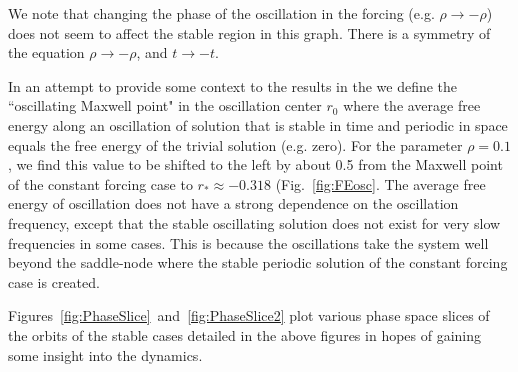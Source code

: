 \documentclass[../main/TimeForcingSHE.tex]{subfiles}
\begin{document}
We note that changing the phase of the oscillation in the forcing (e.g. $\rho\rightarrow-\rho$) does not seem to affect the stable region in this graph. There is a symmetry of the equation $\rho\rightarrow -\rho$, and $t \rightarrow -t$.  


In an attempt to provide some context to the results in the we define the ``oscillating Maxwell point" in the oscillation center $r_0$ where the average free energy along an oscillation of solution that is stable in time and  periodic in space equals the free energy of the trivial solution (e.g. zero).  For the parameter $\rho=0.1$, we find this value to be shifted to the left by about 0.5 from the Maxwell point of the constant forcing case to $r_*\approx -0.318$ (Fig.~\ref{fig:FEosc}.  The average free energy of oscillation does not have a strong dependence on the oscillation frequency, except that the stable oscillating solution does not exist for very slow frequencies in some cases.  This is because the oscillations take the system well beyond the saddle-node where the stable periodic solution of the constant forcing case is created.   

Figures~\ref{fig:PhaseSlice}~and~\ref{fig:PhaseSlice2}  plot various phase space slices of the orbits of the stable cases detailed in the above figures in hopes of gaining some insight into the dynamics.

\FIGphaseslice
\FIGphasesliceTWO
\end{document}
